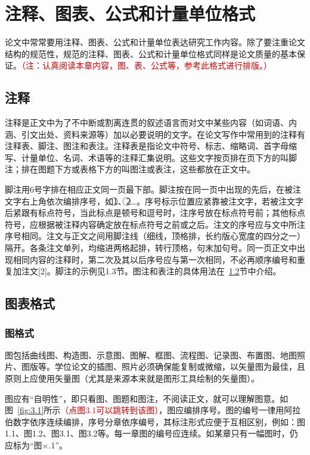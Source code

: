 
\chapter{注释、图表、公式和计量单位格式}
论文中常常要用注释、图表、公式和计量单位表达研究工作内容。除了要注重论文结构的规范性，规范的注释、图表、公式和计量单位格式同样是论文质量的基本保证。\textcolor{red}{（注：认真阅读本章内容，图、表、公式等，参考此格式进行排版。）}
\section{注释}
注释是正文中为了不中断或割离连贯的叙述语言而对文中某些内容（如词语、内涵、引文出处、资料来源等）加以必要说明的文字。在论文写作中常用到的注释有注释表、脚注、图注和表注。注释表是指论文中符号、标志、缩略词、首字母缩写、计量单位、名词、术语等的注释汇集说明。这些文字按页排在页下方的叫脚注；排在图题下方或表格下方的叫图注或表注，这些都放在正文中。

脚注用6号字排在相应正文同一页最下部。脚注按在同一页中出现的先后，在被注文字右上角依次编排序号，如\textcircled{1}、\textcircled{2}…。序号标示位置应紧靠被注文字，若被注文字后紧跟有标点符号，当此标点是顿号和逗号时，注序号放在标点符号前；其他标点符号，应根据被注释内容确定放在标点符号之前或之后。注文的序号应与文中所注序号相同。注文与正文之间用脚注线（细线，顶格排，长约版心宽度的四分之一）隔开。各条注文单列，均缩进两格起排，转行顶格，句末加句号。同一页正文中出现相同内容的注释时，第二次及其以后序号应与第一次相同，不必再顺序编号和重复加注文[2]。脚注的示例见1.3节。图注和表注的具体用法在~\ref{section:3.2}节中介绍。



\section{图表格式}
\label{section:3.2} %
\subsection{图格式}
图包括曲线图、构造图、示意图、图解、框图、流程图、记录图、布置图、地图照片、图版等。学位论文的插图、照片必须确保能复制或微缩，以矢量图为最佳，且原则上应使用矢量图（尤其是来源本来就是图形工具绘制的矢量图）。

图应有“自明性”，即只看图、图题和图注，不阅读正文，就可以理解图意。如图~\ref{fig:3.1}所示\textcolor{red}{（点图3.1可以跳转到该图）}，图应编排序号。图的编号一律用阿拉伯数字依序连续编排，序号分章依序编号，其标注形式应便于互相区别，例如：图1.1、图1.2、图3.1、图3.2等。每一章图的编号应连续。如某章只有一幅图时，仍应标为“图×.1”。

